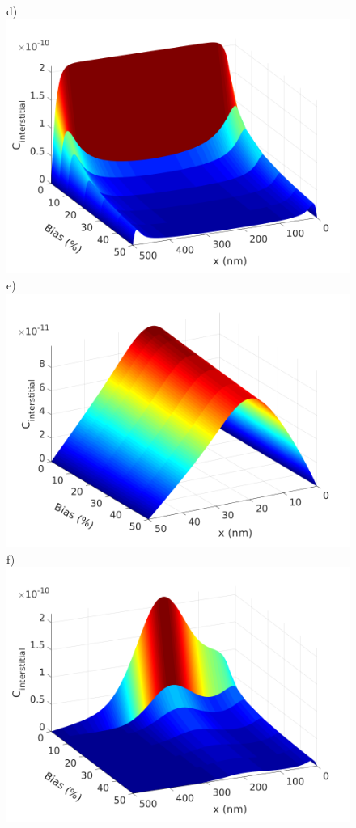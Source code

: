 \documentclass[utf8]{frontiersSCNS} %
\begin{document}
\begin{figure}[htb!]
        d)\includegraphics[scale=0.33]{data_high_neutron_500nm}
        e)\includegraphics[scale=0.33]{data_ion_50nm}
        f)\includegraphics[scale=0.33]{data_ion_500nm}

\end{figure}
\end{document}
